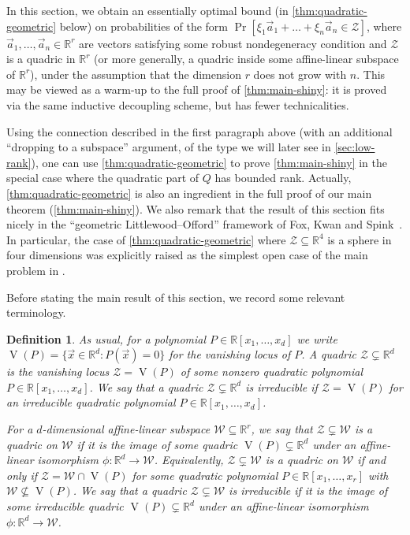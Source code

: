 \documentclass[english]{article}
\newtheorem{definition}[theorem]{Definition}
\theoremstyle{remark}
\numberwithin{equation}{section}
\numberwithin{figure}{section}
\newcommand{\su}{\subseteq}
\newcommand{\RR}{\mathbb{R}}
\newcommand{\mc}{\mathcal}
\newcommand{\on}{\operatorname}
\begin{document}
In this section, we obtain an essentially optimal bound (in \cref{thm:quadratic-geometric} below) on probabilities of the form $\Pr[\xi_1\vec a_1+\dots +\xi_n\vec a_n\in \mathcal Z]$, where $\vec a_1,\dots,\vec a_n\in \RR^{r}$ are vectors satisfying some robust nondegeneracy condition and $\mc Z$ is a quadric in $\RR^r$ (or more generally, a quadric inside some affine-linear subspace of $\RR^r$), under the assumption that the dimension $r$ does not grow with $n$. This may be viewed as a warm-up to the full proof of \cref{thm:main-shiny}: it is proved via the same inductive decoupling scheme, but has fewer technicalities.

Using the connection described in the first paragraph above (with an additional ``dropping to a subspace'' argument, of the type we will later see in \cref{sec:low-rank}), one can use \cref{thm:quadratic-geometric} to prove \cref{thm:main-shiny} in the special case where the quadratic part of $Q$ has bounded rank. Actually, \cref{thm:quadratic-geometric} is also an ingredient in the full proof of our main theorem (\cref{thm:main-shiny}).
We also remark that the result of this section fits nicely in the ``geometric Littlewood--Offord'' framework of Fox, Kwan and Spink~\cite{FKS23}. In particular, the case of \cref{thm:quadratic-geometric} where $\mathcal Z\subseteq \RR^4$ is a sphere in four dimensions was explicitly raised as the simplest open case of the main problem in \cite{FKS23}.

Before stating the main result of this section, we record some relevant terminology.

\newcommand{\zl}{\on{V}}

\begin{definition}
As usual, for a polynomial $P\in \RR[x_1,\dots,x_d]$ we write $\zl(P)=\{\vec{x}\in \RR^d: P(\vec x)=0\}$ for the vanishing locus of $P$. A \emph{quadric} $\mathcal{Z}\subsetneq\RR^{d}$ is the vanishing locus $\mathcal{Z}=\zl(P)$ of some nonzero quadratic polynomial $P\in\RR[x_{1},\dots,x_{d}]$. We say that a quadric $\mathcal{Z}\subsetneq\RR^{d}$ is \emph{irreducible} if $\mathcal{Z}=\zl(P)$ for an irreducible quadratic polynomial $P\in \RR[x_1,\dots,x_d]$.

For a $d$-dimensional affine-linear subspace $\mathcal{W}\su \RR^{r}$,
we say that $\mathcal{Z}\subsetneq\mathcal{W}$ is a \emph{quadric
on $\mathcal{W}$} if it is the image of some quadric $\zl(P)\subsetneq\RR^{d}$
under an affine-linear isomorphism $\phi:\RR^{d}\to\mathcal{W}$. Equivalently, $\mathcal{Z}\subsetneq\mathcal{W}$ is a quadric on $\mathcal{W}$ if and only if $\mathcal{Z}=\mathcal{W}\cap \zl(P)$ for some quadratic polynomial $P\in \RR[x_1,\dots,x_r]$ with $\mathcal{W}\not\subseteq \zl(P)$.  We say that a quadric $\mathcal{Z}\subsetneq\mathcal{W}$ is \emph{irreducible} if it is the image of some irreducible quadric $\zl(P)\subsetneq\RR^{d}$
under an affine-linear isomorphism $\phi:\RR^{d}\to\mathcal{W}$.
\end{definition}
\end{document}
